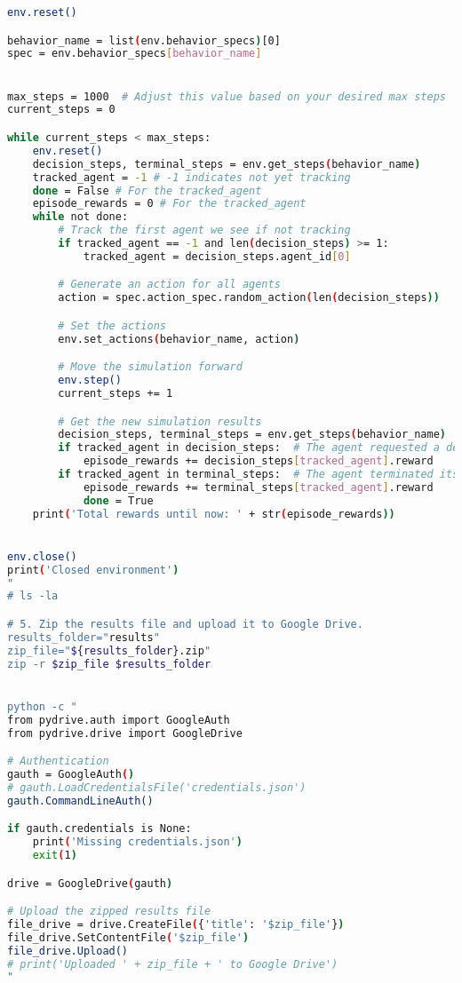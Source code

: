 \begin{lstlisting}[language=bash]
env.reset()

behavior_name = list(env.behavior_specs)[0]
spec = env.behavior_specs[behavior_name]


max_steps = 1000  # Adjust this value based on your desired max steps
current_steps = 0

while current_steps < max_steps:
    env.reset()
    decision_steps, terminal_steps = env.get_steps(behavior_name)
    tracked_agent = -1 # -1 indicates not yet tracking
    done = False # For the tracked_agent
    episode_rewards = 0 # For the tracked_agent
    while not done:
        # Track the first agent we see if not tracking
        if tracked_agent == -1 and len(decision_steps) >= 1:
            tracked_agent = decision_steps.agent_id[0]

        # Generate an action for all agents
        action = spec.action_spec.random_action(len(decision_steps))

        # Set the actions
        env.set_actions(behavior_name, action)

        # Move the simulation forward
        env.step()
        current_steps += 1

        # Get the new simulation results
        decision_steps, terminal_steps = env.get_steps(behavior_name)
        if tracked_agent in decision_steps:  # The agent requested a decision
            episode_rewards += decision_steps[tracked_agent].reward
        if tracked_agent in terminal_steps:  # The agent terminated its episode
            episode_rewards += terminal_steps[tracked_agent].reward
            done = True
    print('Total rewards until now: ' + str(episode_rewards))


env.close()
print('Closed environment')
"
# ls -la

# 5. Zip the results file and upload it to Google Drive.
results_folder="results"
zip_file="${results_folder}.zip"
zip -r $zip_file $results_folder


python -c "
from pydrive.auth import GoogleAuth
from pydrive.drive import GoogleDrive

# Authentication
gauth = GoogleAuth()
# gauth.LoadCredentialsFile('credentials.json')
gauth.CommandLineAuth()

if gauth.credentials is None:
    print('Missing credentials.json')
    exit(1)

drive = GoogleDrive(gauth)

# Upload the zipped results file
file_drive = drive.CreateFile({'title': '$zip_file'})
file_drive.SetContentFile('$zip_file')
file_drive.Upload()
# print('Uploaded ' + zip_file + ' to Google Drive')
"

\end{lstlisting}
  
